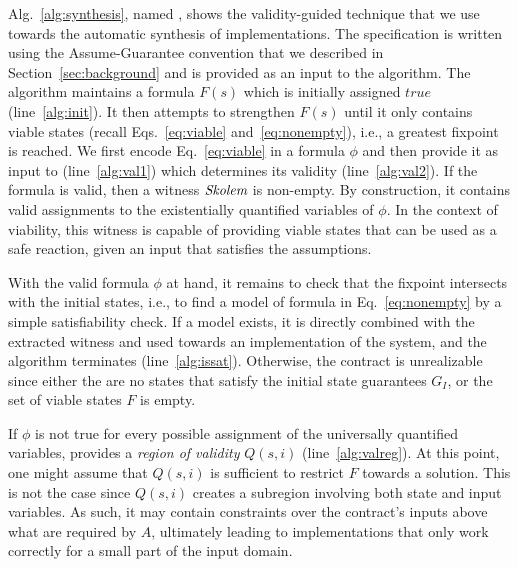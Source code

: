 Alg.~\ref{alg:synthesis}, named \jsynvg, shows the validity-guided technique that we use towards the automatic synthesis of implementations. The specification is written using the Assume-Guarantee convention that we described in Section~\ref{sec:background} and is provided as an input to the algorithm.
The algorithm maintains a formula $F(s)$ which is initially assigned $\mathit{true}$ (line~\ref{alg:init}).
It then attempts to strengthen $F(s)$ until it only contains viable states (recall Eqs.~\ref{eq:viable}
and~\ref{eq:nonempty}), i.e., a greatest fixpoint is reached.
We first encode Eq.~\ref{eq:viable} in a formula $\phi$ and then provide it as input to \aeval (line~\ref{alg:val1}) which determines its validity (line~\ref{alg:val2}).
If the formula is valid, then a witness $\textit{Skolem}$ is non-empty.
By construction, it contains valid assignments to the existentially quantified variables of $\phi$.
In the context of viability, this witness is capable of providing viable states that can be used as a safe
reaction, given an input that satisfies the assumptions.

With the valid formula $\phi$ at hand, it remains to check that the fixpoint intersects with the initial states, i.e., to find a model of formula in Eq.~\ref{eq:nonempty} by a simple satisfiability check.
If a model exists, it is directly combined with the extracted witness and used towards an implementation of the system, and the algorithm terminates (line~\ref{alg:issat}).
Otherwise, the contract is unrealizable since either the are no states that satisfy the
initial state guarantees $G_I$, or the set of viable states $F$ is empty.


If $\phi$ is not true for every possible assignment of the universally
quantified variables, \aeval provides a \textit{region of validity} $Q(s,i)$
(line~\ref{alg:valreg}).
At this point, one might assume that $Q(s,i)$ is sufficient to restrict $F$ towards a solution. This is not the case since $Q(s,i)$ creates a subregion
involving both state and input variables. As such, it may contain constraints
over the contract's inputs above what are required by $A$, ultimately leading to implementations that only work correctly for a small part of the input domain.

